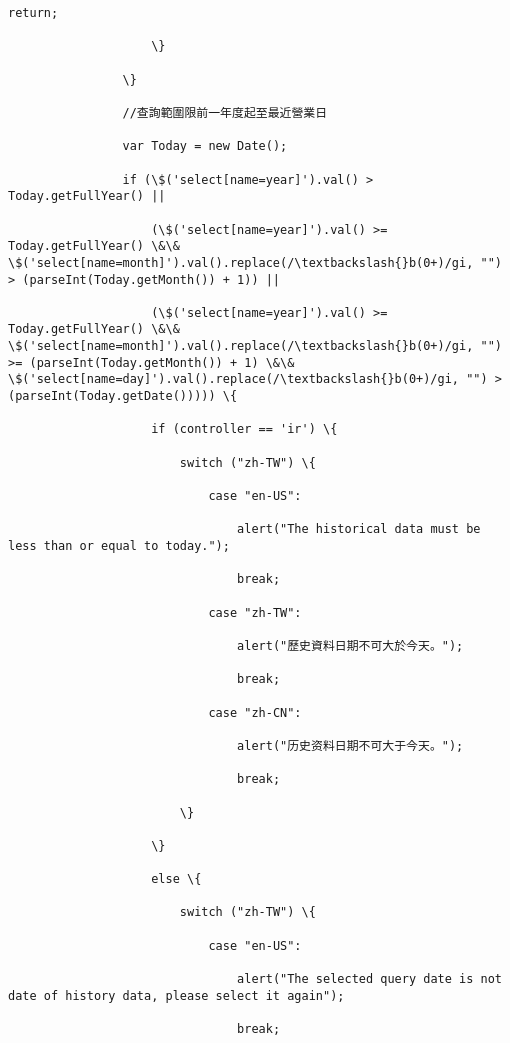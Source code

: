 \documentclass[11pt]{article}
\begin{document}
\begin{Verbatim}[commandchars=\\\{\}]
                        return;

                    \}

                \}

                //查詢範圍限前一年度起至最近營業日

                var Today = new Date();

                if (\$('select[name=year]').val() > Today.getFullYear() ||

                    (\$('select[name=year]').val() >= Today.getFullYear() \&\& \$('select[name=month]').val().replace(/\textbackslash{}b(0+)/gi, "") > (parseInt(Today.getMonth()) + 1)) ||

                    (\$('select[name=year]').val() >= Today.getFullYear() \&\& \$('select[name=month]').val().replace(/\textbackslash{}b(0+)/gi, "") >= (parseInt(Today.getMonth()) + 1) \&\& \$('select[name=day]').val().replace(/\textbackslash{}b(0+)/gi, "") > (parseInt(Today.getDate())))) \{

                    if (controller == 'ir') \{

                        switch ("zh-TW") \{

                            case "en-US":

                                alert("The historical data must be less than or equal to today.");

                                break;

                            case "zh-TW":

                                alert("歷史資料日期不可大於今天。");

                                break;

                            case "zh-CN":

                                alert("历史资料日期不可大于今天。");

                                break;

                        \}

                    \}

                    else \{

                        switch ("zh-TW") \{

                            case "en-US":

                                alert("The selected query date is not date of history data, please select it again");

                                break;


\end{Verbatim}
\end{document}
